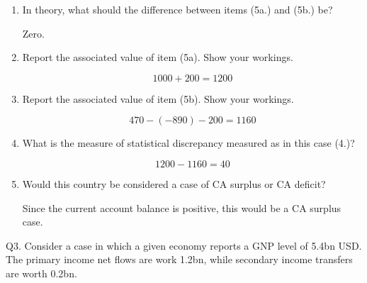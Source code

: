 \documentclass[12pt]{article}
\begin{document}
\begin{enumerate}[1)]
	\item In theory, what should the difference between items (5a.) and (5b.) be?
	
	\vspace{0.2in}
	Zero.
	\vspace{0.2in}
	
	\item Report the associated value of item (5a). Show your workings.
	
	\vspace{0.2in}
	$$1000+200=1200$$
	\vspace{0.2in}
	
	\item Report the associated value of item (5b). Show your workings.
	
	\vspace{0.2in}
	$$470-(-890)-200=1160$$
	\vspace{0.2in}
	
	\item What is the measure of statistical discrepancy measured as in this case (4.)?
	
	\vspace{0.2in}
	$$1200-1160=40$$
	\vspace{0.2in}
	
	\item Would this country be considered a case of CA surplus or CA deficit?

	\vspace{0.2in}	
	Since the current account balance is positive, this would be a CA surplus case.
	\vspace{0.2in} 
	
\end{enumerate}


\noindent Q3. Consider a case in which a given economy reports a GNP level of 5.4bn USD. 
The primary income net flows are work 1.2bn, while secondary income transfers are worth 0.2bn. 
\end{document}
